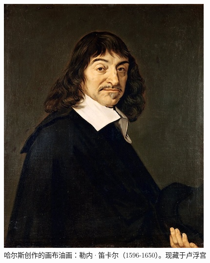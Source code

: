 \documentclass[b5paper]{ctexart}
\begin{document}
\begin{figure}[htbp]
 \centering
 \includegraphics[scale=0.4]{img/Descartes}
 \caption{哈尔斯创作的画布油画：勒内·笛卡尔（1596-1650）。现藏于卢浮宫}
 \label{fig:Decartes}
\end{figure}
\end{document}
